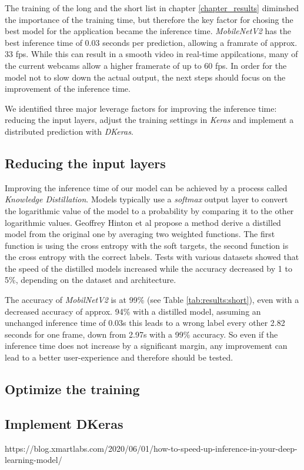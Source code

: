 The training of the long and the short list in chapter \ref{chapter_results} diminshed the importance of the training time, but therefore the key factor for chosing the best model for the application became the inference time. \textit{MobileNetV2} has the best inference time of 0.03 seconds per prediction, allowing a framrate of approx. 33 fps. While this can result in a smooth video in real-time appilcations, many of the current webcams allow a higher framerate of up to 60 fps. In order for the model not to slow down the actual output, the next steps should focus on the improvement of the inference time.

We identified three major leverage factors for improving the inference time: reducing the input layers, adjust the training settings in \textit{Keras} and implement a distributed prediction with \textit{DKeras}.

\subsection{Reducing the input layers}\label{chapter_distill}
Improving the inference time of our model can be achieved by a process called \textit{Knowledge Distillation}\cite{hinton2015distilling}. Models typically use a \textit{softmax} output layer to convert the logarithmic value of the model to a probability by comparing it to the other logarithmic values. Geoffrey Hinton et al\cite{hinton2015distilling} propose a method derive a distilled model from the original one by averaging two weighted functions. The first function is using the cross entropy with the soft targets, the second function is the cross entropy with the correct labels. Tests with various datasets showed that the speed of the distilled models increased while the accuracy decreased by 1 to 5\%, depending on the dataset and architecture.

The accuracy of \textit{MobilNetV2} is at 99\% (see Table \ref{tab:results:short}), even with a decreased accuracy of approx. 94\% with a distilled model, assuming an unchanged inference time of 0.03s this leads to a wrong label every other 2.82 seconds for one frame, down from 2.97s with a 99\% accuracy. So even if the inference time does not increase by a significant margin, any improvement can lead to a better user-experience and therefore should be tested.

\subsection{Optimize the training}

\subsection{Implement DKeras}
https://blog.xmartlabs.com/2020/06/01/how-to-speed-up-inference-in-your-deep-learning-model/